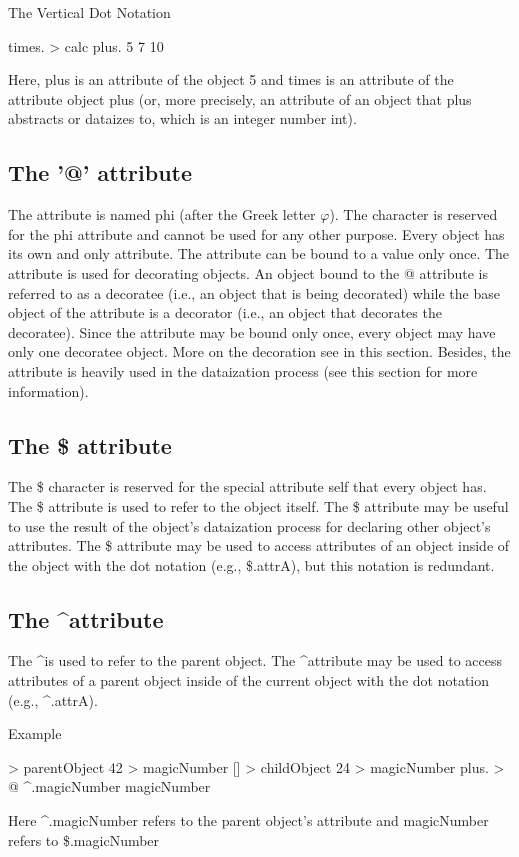 \documentclass[12pt]{book}
\begin{document}
The Vertical Dot Notation
\begin{ffcode}
times. > calc
  plus.
    5
    7
  10
\end{ffcode}

Here, plus is an attribute of the object 5 and times is an attribute of the attribute object plus (or, more precisely, an attribute of an object that plus abstracts or dataizes to, which is an integer number int).

\subsection{The '@' attribute}
The \@ attribute is named phi (after the Greek letter $\varphi$). The \@ character is reserved for the phi attribute and cannot be used for any other purpose. Every object has its own and only \@ attribute. The \@ attribute can be bound to a value only once.
The \@ attribute is used for decorating objects. An object bound to the @ attribute is referred to as a decoratee (i.e., an object that is being decorated) while the base object of the \@ attribute is a decorator (i.e., an object that decorates the decoratee). Since the \@ attribute may be bound only once, every object may have only one decoratee object. More on the decoration see in this section.
Besides, the \@ attribute is heavily used in the dataization process (see this section for more information).

\subsection{The \$ attribute}
The \$ character is reserved for the special attribute self that every object has. The \$ attribute is used to refer to the object itself.
The \$ attribute may be useful to use the result of the object's dataization process for declaring other object's attributes.
The \$ attribute may be used to access attributes of an object inside of the object with the dot notation (e.g., \$.attrA), but this notation is redundant.

\subsection{The \textasciicircum attribute}
The  \textasciicircum is used to refer to the parent object.
The \textasciicircum attribute may be used to access attributes of a parent object inside of the current object with the dot notation (e.g., \textasciicircum.attrA).

Example
\begin{ffcode}
[] > parentObject
  42 > magicNumber
  [] > childObject
    24 > magicNumber
    plus. > @
      ^.magicNumber
      magicNumber
\end{ffcode}
Here \textasciicircum.magicNumber refers to the parent object's attribute and magicNumber refers to \$.magicNumber
\end{document}
